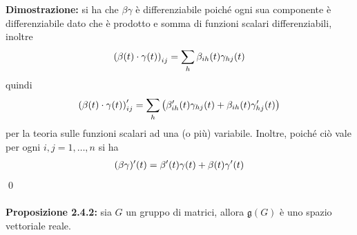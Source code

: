 \documentclass{article}
\begin{document}
\textbf{Dimostrazione:} si ha che $\beta\gamma$ è differenziabile poiché ogni sua componente è differenziabile dato che è prodotto e somma di funzioni scalari differenziabili, inoltre
\begin{gather}
    \left( \beta(t) \cdot \gamma(t) \right)_{ij} = \sum_h \beta_{ih}(t)\gamma_{hj}(t) \notag 
\end{gather}
quindi
\begin{gather}
    \left( \beta(t) \cdot \gamma(t) \right)'_{ij} = \sum_h \left( \beta'_{ih}(t)\gamma_{hj}(t) + \beta_{ih}(t)\gamma'_{hj}(t) \right) \notag
\end{gather}
per la teoria sulle funzioni scalari ad una (o più) variabile. Inoltre, poiché ciò vale per ogni $i, j = 1, \dots, n$ si ha
\begin{gather}
    (\beta\gamma)'(t) = \beta'(t)\gamma(t) + \beta(t)\gamma'(t) \notag
\end{gather} \qed \\ \\
\textbf{Proposizione 2.4.2:} sia $G$ un gruppo di matrici, allora $\mathfrak{g}(G)$ è uno spazio vettoriale reale. \\
\end{document}
